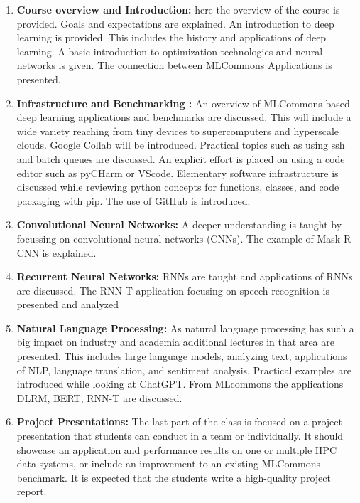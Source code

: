 \documentclass[utf8]{FrontiersinVancouver} %
\begin{document}
\begin{enumerate}
  
\item{\bf Course overview and Introduction:} here the overview of the
  course is provided. Goals and expectations are explained. An
  introduction to deep learning is provided. This includes the history and
  applications of deep learning. A basic introduction to optimization
  technologies and neural networks is given. The connection between
  MLCommons Applications is presented.

\item{\bf Infrastructure and Benchmarking :} An overview of
  MLCommons-based deep learning applications and benchmarks are
  discussed. This will include a wide variety reaching from tiny
  devices to supercomputers and hyperscale clouds. Google Collab will
  be introduced. Practical topics such as using ssh and batch queues
  are discussed. An explicit effort is placed on using a code editor
  such as pyCHarm or VScode. Elementary software infrastructure is
  discussed while reviewing python concepts for functions, classes,
  and code packaging with pip. The use of GitHub is introduced.
  
\item{\bf Convolutional Neural Networks:} A deeper understanding is taught
  by focussing on convolutional neural networks (CNNs). The example of
  Mask R-CNN is explained.

\item{\bf Recurrent Neural Networks:} RNNs are taught and applications of
  RNNs are discussed. The RNN-T application focusing on speech
  recognition is presented and analyzed

\item{\bf Natural Language Processing:} As natural language processing has
  such a big impact on industry and academia additional lectures in that area
   are presented. This includes large language models,
  analyzing text, applications of NLP, language translation, and sentiment
  analysis.  Practical examples are introduced while looking at
  ChatGPT. From MLcommons the applications DLRM, BERT, RNN-T are
  discussed.

\item{\bf Project Presentations:} The last part of the class is
  focused on a project presentation that students can conduct in a
  team or individually. It should showcase an application and
  performance results on one or multiple HPC data systems, or include
  an improvement to an existing MLCommons benchmark. It is expected
  that the students write a high-quality project report.
  
 \end{enumerate}
\end{document}
